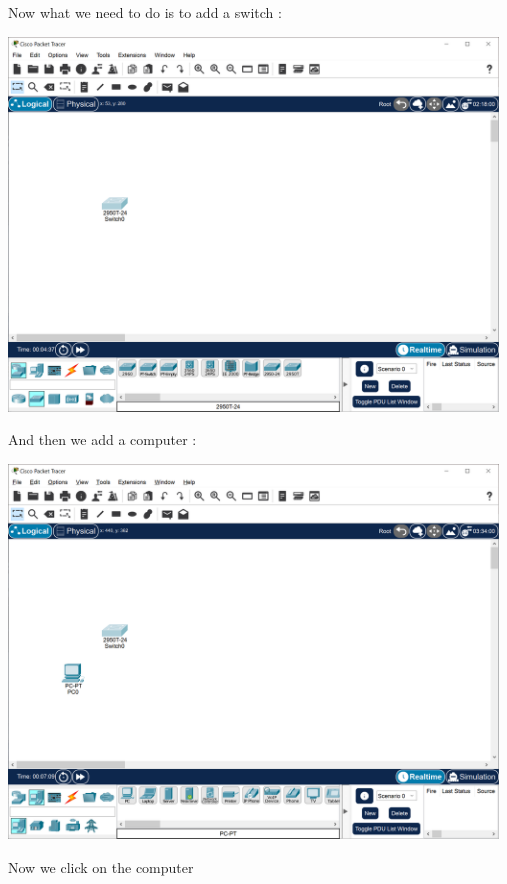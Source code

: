 \documentclass[a4paper,12pt]{article}
\begin{document}
\noindent Now what we need to do is to add a switch : \newline

\noindent \includegraphics[width=13cm]{./step-by-step/1.PNG}
\clearpage

\noindent And then we add a computer : \newline

\noindent \includegraphics[width=13cm]{./step-by-step/2.PNG}
\clearpage

\noindent Now we click on the computer \newline
\end{document}
